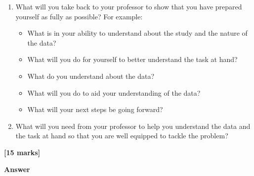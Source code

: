 \documentclass[
  10t,
]{article}
\providecommand{\tightlist}{%
  \setlength{\itemsep}{0pt}\setlength{\parskip}{0pt}}\usepackage{longtable,booktabs,array}
\begin{document}
\begin{enumerate}
\def\labelenumi{\alph{enumi}.}
\tightlist
\item
  What will you take back to your professor to show that you have
  prepared yourself as fully as possible? For example:

  \begin{itemize}
  \tightlist
  \item
    What is in your ability to understand about the study and the nature
    of the data?
  \item
    What will you do for yourself to better understand the task at hand?
  \item
    What do you understand about the data?
  \item
    What will you do to aid your understanding of the data?
  \item
    What will your next steps be going forward?
  \end{itemize}
\item
  What will you need from your professor to help you understand the data
  and the task at hand so that you are well equipped to tackle the
  problem?
\end{enumerate}

\textbf{{[}15 marks{]}}

\textbf{Answer}
\end{document}
